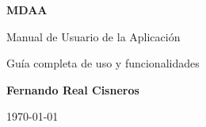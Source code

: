 \documentclass[12pt,a4paper]{report}
\begin{document}
\begin{titlepage}
    \centering
    \vspace*{4cm}
    {\Huge \bfseries MDAA \par}
    \vspace{1.5cm}
    {\Large Manual de Usuario de la Aplicación \par}
    \vspace{1cm}
    {\large Guía completa de uso y funcionalidades \par}
    \vspace{2cm}
    {\Large \textbf{Fernando Real Cisneros} \par}
    \vfill
    {\large \today \par}
\end{titlepage}

\tableofcontents
\newpage










\end{document}
